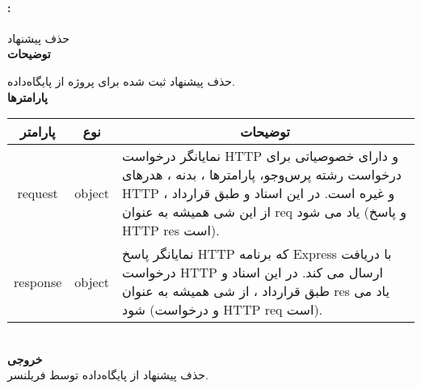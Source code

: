 \paragraph{:}
حذف پیشنهاد‌ 
\\
\textbf{توضیحات}
\hr
\begin{flushleft}
	\framebox[.9\textwidth][l]{
		\lr{
			\textcolor{type}{void}
			\textcolor{func}{getDelRequest}
			\textcolor{symb}{(}
			\textcolor{type}{object}
			\textcolor{arg}{request}
			\textcolor{symb}{,}
			\textcolor{type}{object}
			\textcolor{arg}{response}
			\textcolor{symb}{);}
		}
	}
\end{flushleft}
حذف پیشنهاد ثبت شده برای پروژه از پایگاه‌داده.
\\
\textbf{پارامترها}
\hr \\[10pt]
\begin{tabular}{|m{4cm}|m{3cm}|m{10cm}|}
	\hline
	\multicolumn{1}{|c}{پارامتر}
	&
	\multicolumn{1}{|c}{نوع}
	&
	\multicolumn{1}{|c|}{توضیحات}
	\\
	\hline
	\multicolumn{1}{|c}{request}
	&
	\multicolumn{1}{|c|}{object}
	&
	نمایانگر درخواست HTTP و دارای خصوصیاتی برای درخواست رشته پرس‌و‌جو، پارامترها ، بدنه ، هدرهای HTTP و غیره است.
	در این اسناد و طبق قرارداد ، از این شی همیشه به عنوان req یاد می شود (و پاسخ HTTP res است).
	\\
	\hline
	\multicolumn{1}{|c}{response}
	&
	\multicolumn{1}{|c|}{object}
	&
	نمایانگر پاسخ HTTP که برنامه Express با دریافت درخواست HTTP ارسال می کند.
	در این اسناد و طبق قرارداد ، از شی همیشه به عنوان res یاد می شود (و درخواست HTTP req است).
	\\
	\hline
\end{tabular}
\\[10pt]
\textbf{خروجی}
\hr \\
حذف پیشنهاد از پایگاه‌داده توسط فریلنسر.

